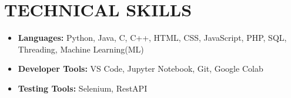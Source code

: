 \section{TECHNICAL SKILLS} {
    \begin{itemize}[leftmargin=0.15in, label={}]
        \item{\textbf{\normalsize{Languages:}}{ \normalsize{Python, Java, C, C++, HTML, CSS, JavaScript, PHP, SQL, Threading, Machine Learning(ML)}}}
        \vspace{-0.3cm}
        \item{\textbf{\normalsize{Developer Tools:}}{ \normalsize{VS Code, Jupyter Notebook, Git, Google Colab}}}
        \vspace{-0.3cm}
        \item{\textbf{\normalsize{Testing Tools:}}{ \normalsize{Selenium, RestAPI}}}
    \end{itemize}
    \vspace{-10pt}
}